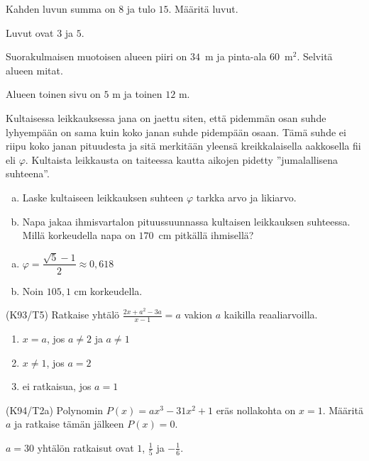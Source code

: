 \begin{tehtavasivu}
\begin{tehtava}
    Kahden luvun summa on $8$ ja tulo $15$. Määritä luvut.
    \begin{vastaus}
		Luvut ovat $3$ ja $5$.
    \end{vastaus}
\end{tehtava}

\begin{tehtava}
    Suorakulmaisen muotoisen alueen piiri on $34$~m ja pinta-ala $60$~m$^2$. Selvitä alueen mitat.
    \begin{vastaus}
		Alueen toinen sivu on $5$ m ja toinen $12$ m.
    \end{vastaus}
\end{tehtava}

\begin{tehtava}
    Kultaisessa leikkauksessa jana on jaettu siten, että pidemmän osan suhde lyhyempään on sama kuin koko janan suhde pidempään osaan. Tämä suhde ei riipu koko janan pituudesta ja sitä merkitään yleensä kreikkalaisella aakkosella fii eli $\varphi$. Kultaista leikkausta on taiteessa kautta aikojen pidetty ''jumalallisena suhteena''.
		\begin{enumerate}[a)]
            \item Laske kultaiseen leikkauksen suhteen $\varphi$ tarkka arvo ja likiarvo.
            \item Napa jakaa ihmisvartalon pituussuunnassa kultaisen leikkauksen suhteessa. Millä korkeudella napa on $170$~cm pitkällä ihmisellä?
        \end{enumerate}
    \begin{vastaus}
        \begin{enumerate}[a)]
            \item $ \varphi = \dfrac{\sqrt{5}-1}{2} \approx 0,618$
            \item Noin $105,1$ cm korkeudella.
        \end{enumerate}
    \end{vastaus}
\end{tehtava}

\begin{tehtava}
(K93/T5) Ratkaise yhtälö
        $\frac{2x+a^2-3a}{x-1}=a$ vakion $a$ kaikilla reaaliarvoilla.
\begin{vastaus}
        \begin{enumerate}
         \item{$x=a$, jos $a \neq 2$ ja $a \neq 1$}
         \item{$x\neq 1$, jos $a=2$}
         \item{ei ratkaisua, jos $a=1$}
        \end{enumerate}
    \end{vastaus}
\end{tehtava}

\begin{tehtava}
(K94/T2a) Polynomin $P(x)=ax^3-31x^2+1$ eräs nollakohta on $x=1$. Määritä $a$ ja ratkaise tämän jälkeen $P(x)=0$.
\begin{vastaus}
      $a=30$ yhtälön ratkaisut ovat $1$, $\frac{1}{5}$ ja $-\frac{1}{6}$.
    \end{vastaus}
\end{tehtava}

\end{tehtavasivu}